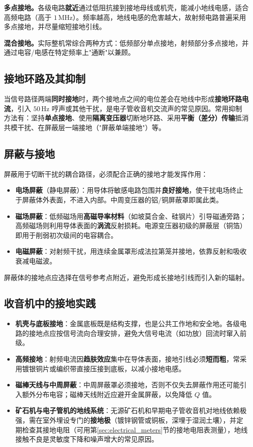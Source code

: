\documentclass[12pt,UTF8]{ctexbook}
\begin{document}
\textbf{多点接地。}各级电路\textbf{就近}通过低阻抗接到接地母线或机壳，能减小地线电感，适合高频电路（高于 $1\,\mathrm{MHz}$）。频率越高，地线电感的危害越大，故射频电路普遍采用多点接地，并尽量缩短接地引线。

\textbf{混合接地。}实际整机常综合两种方式：低频部分单点接地，射频部分多点接地，并通过电容/电感在特定频率上"通断"以兼顾。

\subsection{接地环路及其抑制}

当信号路径两端\textbf{同时接地}时，两个接地点之间的电位差会在地线中形成\textbf{接地环路电流}，引入 $50\,\mathrm{Hz}$ 哼声或其他干扰，是电子管收音机交流声的常见原因。常用抑制方法有：坚持\textbf{单点接地}、使用\textbf{隔离变压器}切断地环路、采用\textbf{平衡（差分）传输}抵消共模干扰、在屏蔽层一端接地（"屏蔽单端接地"）等。

\subsection{屏蔽与接地}

屏蔽用于切断干扰的耦合路径，必须配合正确的接地才能发挥作用：
\begin{itemize}
  \item \textbf{电场屏蔽}（静电屏蔽）：用导体将敏感电路包围并\textbf{良好接地}，使干扰电场终止于屏蔽体外表面，不进入内部。中周变压器的铝/铜屏蔽罩即属此类。
  \item \textbf{磁场屏蔽}：低频磁场用\textbf{高磁导率材料}（如坡莫合金、硅钢片）引导磁通旁路；高频磁场则利用导体表面的\textbf{涡流}反射损耗。电源变压器初级的屏蔽层（铜箔）即用于削弱初次级间的电容耦合。
  \item \textbf{电磁屏蔽}：对射频干扰，用连续金属罩形成法拉第笼并接地，依靠反射和吸收衰减电磁波。
\end{itemize}
屏蔽体的接地点应选择在信号参考点附近，避免形成长接地引线而引入新的辐射。

\subsection{收音机中的接地实践}

\begin{itemize}
  \item \textbf{机壳与底板接地}：金属底板既是结构支撑，也是公共工作地和安全地。各级电路的接地点应按信号流向合理安排，避免大信号电流（如功放）回流时窜入前级。
  \item \textbf{高频接地}：射频电流因\textbf{趋肤效应}集中在导体表面，接地引线必须\textbf{短而粗}，常采用镀银铜片或编织带直接压接到底板，以减小接地电感。
  \item \textbf{磁棒天线与中周屏蔽}：中周屏蔽罩必须接地，否则不仅失去屏蔽作用还可能引入额外分布电容；磁棒天线附近应避开金属屏蔽，以免降低 $Q$ 值。
  \item \textbf{矿石机与电子管机的地线系统}：无源矿石机和早期电子管收音机对地线依赖极强，需在室外埋设专门的\textbf{接地极}（镀锌钢管或铜板，深埋于湿润土壤），并定期检查其接地电阻（可用第\ref{sec:electrical_meters}节的接地电阻表测量），地线接触不良是灵敏度下降和噪声增大的常见原因。
\end{itemize}
\end{document}
